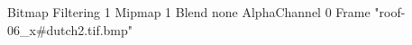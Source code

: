 {Bitmap
	{Filtering 1}
	{Mipmap 1}
	{Blend none}
	{AlphaChannel 0}
	{Frame "roof-06_x#dutch2.tif.bmp"}
}
